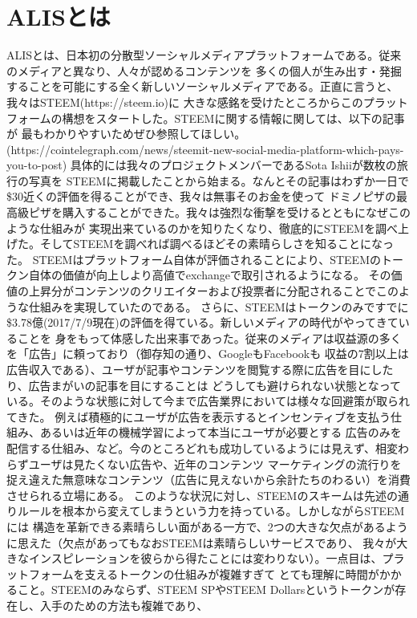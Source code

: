 \documentclass{jsarticle}
\begin{document}
\section{ALISとは}
ALISとは、日本初の分散型ソーシャルメディアプラットフォームである。従来のメディアと異なり、人々が認めるコンテンツを
多くの個人が生み出す・発掘することを可能にする全く新しいソーシャルメディアである。正直に言うと、我々はSTEEM(https://steem.io)に
大きな感銘を受けたところからこのプラットフォームの構想をスタートした。STEEMに関する情報に関しては、以下の記事が
最もわかりやすいためぜひ参照してほしい。(https://cointelegraph.com/news/steemit-new-social-media-platform-which-pays-you-to-post)
具体的には我々のプロジェクトメンバーであるSota Ishiiが数枚の旅行の写真を
STEEMに掲載したことから始まる。なんとその記事はわずか一日で\$30近くの評価を得ることができ、我々は無事そのお金を使って
ドミノピザの最高級ピザを購入することができた。我々は強烈な衝撃を受けるとともになぜこのような仕組みが
実現出来ているのかを知りたくなり、徹底的にSTEEMを調べ上げた。そしてSTEEMを調べれば調べるほどその素晴らしさを知ることになった。
STEEMはプラットフォーム自体が評価されることにより、STEEMのトークン自体の価値が向上しより高値でexchangeで取引されるようになる。
その価値の上昇分がコンテンツのクリエイターおよび投票者に分配されることでこのような仕組みを実現していたのである。
さらに、STEEMはトークンのみですでに\$3.78億(2017/7/9現在)の評価を得ている。新しいメディアの時代がやってきていることを
身をもって体感した出来事であった。従来のメディアは収益源の多くを「広告」に頼っており（御存知の通り、GoogleもFacebookも
収益の7割以上は広告収入である）、ユーザが記事やコンテンツを閲覧する際に広告を目にしたり、広告まがいの記事を目にすることは
どうしても避けられない状態となっている。そのような状態に対して今まで広告業界においては様々な回避策が取られてきた。
例えば積極的にユーザが広告を表示するとインセンティブを支払う仕組み、あるいは近年の機械学習によって本当にユーザが必要とする
広告のみを配信する仕組み、など。今のところどれも成功しているようには見えず、相変わらずユーザは見たくない広告や、近年のコンテンツ
マーケティングの流行りを捉え違えた無意味なコンテンツ（広告に見えないから余計たちのわるい）を消費させられる立場にある。
このような状況に対し、STEEMのスキームは先述の通りルールを根本から変えてしまうという力を持っている。しかしながらSTEEMには
構造を革新できる素晴らしい面がある一方で、2つの大きな欠点があるように思えた（欠点があってもなおSTEEMは素晴らしいサービスであり、
我々が大きなインスピレーションを彼らから得たことには変わりない）。一点目は、プラットフォームを支えるトークンの仕組みが複雑すぎて
とても理解に時間がかかること。STEEMのみならず、STEEM SPやSTEEM Dollarsというトークンが存在し、入手のための方法も複雑であり、
\end{document}
